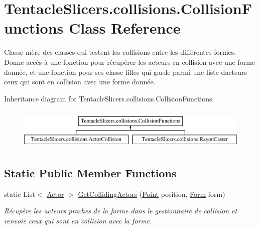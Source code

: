\hypertarget{class_tentacle_slicers_1_1collisions_1_1_collision_functions}{}\section{Tentacle\+Slicers.\+collisions.\+Collision\+Functions Class Reference}
\label{class_tentacle_slicers_1_1collisions_1_1_collision_functions}


Classe mère des classes qui testent les collisions entre les différentes formes. Donne accès à une fonction pour récupérer les acteurs en collision avec une forme donnée, et une fonction pour ses classe filles qui garde parmi une liste d\textquotesingle{}acteurs ceux qui sont en collision avec une forme donnée.  


Inheritance diagram for Tentacle\+Slicers.\+collisions.\+Collision\+Functions\+:\begin{figure}[H]
\begin{center}
\leavevmode
\includegraphics[height=2.000000cm]{class_tentacle_slicers_1_1collisions_1_1_collision_functions}
\end{center}
\end{figure}
\subsection*{Static Public Member Functions}
\begin{DoxyCompactItemize}
\item 
static List$<$ \hyperlink{class_tentacle_slicers_1_1actors_1_1_actor}{Actor} $>$ \hyperlink{class_tentacle_slicers_1_1collisions_1_1_collision_functions_ae449c2800a053c729dc4010535cdb19f}{Get\+Colliding\+Actors} (\hyperlink{class_tentacle_slicers_1_1general_1_1_point}{Point} position, \hyperlink{class_tentacle_slicers_1_1collisions_1_1_form}{Form} form)
\begin{DoxyCompactList}\small\item\em Récupère les acteurs proches de la forme dans le gestionnaire de collision et renvoie ceux qui sont en collision avec la forme. \end{DoxyCompactList}\end{DoxyCompactItemize}
